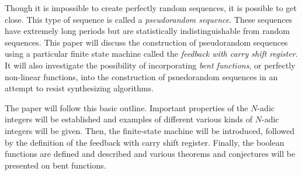 \par Though it is impossible to create perfectly random sequences, it is possible to get close.
This type of sequence is called a {\em pseudorandom sequence}. These sequences have extremely
long periods but are statistically indistinguishable from random sequences. This paper will discuss
the construction of pseudorandom sequences using a particular finite state machine
called the {\em feedback with carry shift register}. It will also investigate the possibility of
incorporating {\em bent functions}, or perfectly non-linear functions, into the construction of
psuedorandom sequences in an attempt to resist synthesizing algorithms. 

\par The paper will follow this basic outline. Important properties of the $N$-adic integers
will be established and examples of different various kinds of $N$-adic integers will be given. 
Then, the finite-state machine will be introduced, followed by the definition of the feedback
with carry shift register. Finally, the boolean functions are defined and described and various
theorems and conjectures will be presented on bent functions.
